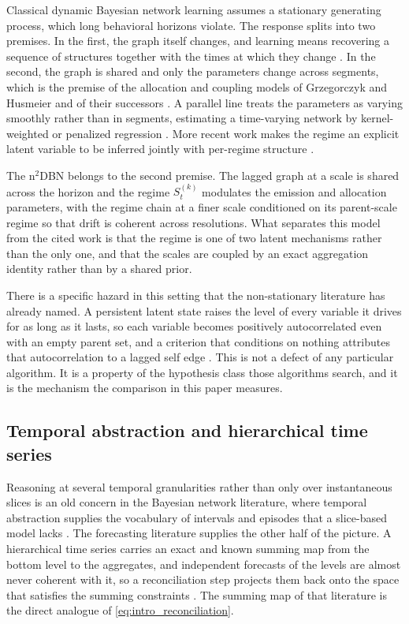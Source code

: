 Classical dynamic Bayesian network learning assumes a stationary generating
process, which long behavioral horizons violate. The response splits into two
premises. In the first, the graph itself changes, and learning means recovering a
sequence of structures together with the times at which they change
\citep{robinson2010learning, lebre2010artiva}. In the second, the graph is shared
and only the parameters change across segments, which is the premise of the
allocation and coupling models of Grzegorczyk and Husmeier and of their
successors \citep{grzegorczyk2011nhdbncontinuous, dondelinger2013edison}. A
parallel line treats the parameters as varying smoothly rather than in segments,
estimating a time-varying network by kernel-weighted or penalized regression
\citep{song2009tvdbn, kolar2010estimating}. More recent work makes the regime an
explicit latent variable to be inferred jointly with per-regime structure
\citep{saggioro2020rpcmci, rahmani2025castor}.

The n\(^2\)DBN belongs to the second premise. The lagged graph at a scale is
shared across the horizon and the regime \(S_t^{(k)}\) modulates the emission and
allocation parameters, with the regime chain at a finer scale conditioned on its
parent-scale regime so that drift is coherent across resolutions. What separates
this model from the cited work is that the regime is one of two latent
mechanisms rather than the only one, and that the scales are coupled by an exact
aggregation identity rather than by a shared prior.

There is a specific hazard in this setting that the non-stationary literature has
already named. A persistent latent state raises the level of every variable it
drives for as long as it lasts, so each variable becomes positively
autocorrelated even with an empty parent set, and a criterion that conditions on
nothing attributes that autocorrelation to a lagged self edge
\citep{runge2018pitfalls}. This is not a defect of any particular algorithm. It
is a property of the hypothesis class those algorithms search, and it is the
mechanism the comparison in this paper measures.

\subsection{Temporal abstraction and hierarchical time series}
\label{sec:related_abstraction}

Reasoning at several temporal granularities rather than only over instantaneous
slices is an old concern in the Bayesian network literature, where temporal
abstraction supplies the vocabulary of intervals and episodes that a slice-based
model lacks \citep{burns2003temporal}. The forecasting literature supplies the
other half of the picture. A hierarchical time series carries an exact and known
summing map from the bottom level to the aggregates, and independent forecasts of
the levels are almost never coherent with it, so a reconciliation step projects
them back onto the space that satisfies the summing constraints
\citep{athanasopoulos2009tourism, wickramasuriya2019mint}. The summing map of
that literature is the direct analogue of \cref{eq:intro_reconciliation}.

